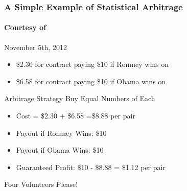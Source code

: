 \documentclass[handout]{beamer}
\begin{document}
\begin{frame}
\frametitle{A Simple Example of Statistical Arbitrage}
\framesubtitle{Courtesy of  }

\begin{block}{November 5th, 2012}
	\begin{itemize}
		\item\$2.30 for contract paying \$10 if Romney wins on  	
		\item \$6.58 for contract paying \$10 if Obama wins on 
	\end{itemize}
\end{block}

\begin{alertblock}{Arbitrage Strategy}\pause
Buy Equal Numbers of Each \pause
	\begin{itemize}
		\item Cost = \$2.30 + \$6.58 =\$8.88 per pair 
		\item Payout if Romney Wins: \$10 
		\item Payout if Obama Wins: \$10
		\item Guaranteed Profit: \$10 - \$8.88 = \$1.12 per pair
	\end{itemize} 

\end{alertblock}



\end{frame}
\begin{frame}
\centering \Huge Four Volunteers Please!

\end{frame}
\end{document}
